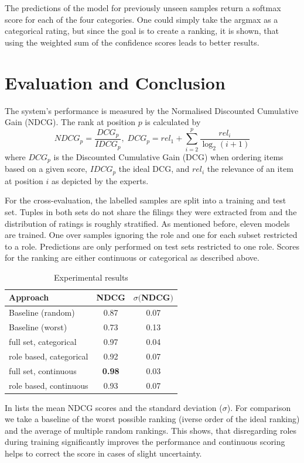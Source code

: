 The predictions of the model for previously unseen samples return a softmax score for each of the four categories. One could simply take the argmax as a categorical rating, but since the goal is to create a ranking, it is shown, that using the weighted sum of the confidence scores leads to better results.

\section{Evaluation and Conclusion}
The system's performance is measured by the Normalised Discounted Cumulative Gain (NDCG). The rank at position $p$ is calculated by
\begin{equation}
NDCG_p = \frac{DCG_p}{IDCG_p},\;
DCG_p = rel_1 + \sum_{i=2}^{p} \frac{rel_i}{\log_2(i+1)}
\end{equation}
where $DCG_p$ is the Discounted Cumulative Gain (DCG) when ordering items based on a given score, $IDCG_p$ the ideal DCG, and $rel_i$ the relevance of an item at position $i$ as depicted by the experts.

For the cross-evaluation, the labelled samples are split into a training and test set. Tuples in both sets do not share the filings they were extracted from and the distribution of ratings is roughly stratified. As mentioned before, eleven models are trained. One over samples ignoring the role and one for each subset restricted to a role. Predictions are only performed on test sets restricted to one role. Scores for the ranking are either continuous or categorical as described above.

\begin{table}
	\caption{Experimental results}
	\label{tab:results}
	\begin{tabular}{lcc}
		\toprule
		Approach & NDCG & $\sigma ($NDCG$)$\\
		\midrule
		Baseline (random) & 0.87 & 0.07\\
		Baseline (worst) & 0.73 & 0.13\\
		\midrule
		full set, categorical & 0.97 & 0.04 \\
		role based, categorical & 0.92 & 0.07  \\
		full set, continuous & \textbf{0.98} & 0.03 \\
		role based, continuous & 0.93 & 0.07 \\
		\bottomrule
	\end{tabular}
\end{table}

In  lists the mean NDCG scores and the standard deviation ($\sigma$). For comparison we take a baseline of the worst possible ranking (iverse order of the ideal ranking) and the average of multiple random rankings. This shows, that disregarding roles during training significantly improves the performance and continuous scoring helps to correct the score in cases of slight uncertainty.

